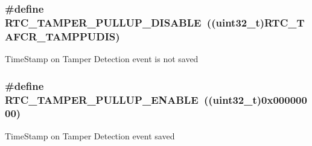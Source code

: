 \subsubsection[{\texorpdfstring{R\+T\+C\+\_\+\+T\+A\+M\+P\+E\+R\+\_\+\+P\+U\+L\+L\+U\+P\+\_\+\+D\+I\+S\+A\+B\+LE}{RTC_TAMPER_PULLUP_DISABLE}}]{\setlength{\rightskip}{0pt plus 5cm}\#define R\+T\+C\+\_\+\+T\+A\+M\+P\+E\+R\+\_\+\+P\+U\+L\+L\+U\+P\+\_\+\+D\+I\+S\+A\+B\+LE~((uint32\+\_\+t)R\+T\+C\+\_\+\+T\+A\+F\+C\+R\+\_\+\+T\+A\+M\+P\+P\+U\+D\+IS)}\hypertarget{group___r_t_c_ex___tamper___pull___u_p___definitions_ga60baa301b46be499bc7f827664df0300}{}\label{group___r_t_c_ex___tamper___pull___u_p___definitions_ga60baa301b46be499bc7f827664df0300}
Time\+Stamp on Tamper Detection event is not saved 
\subsubsection[{\texorpdfstring{R\+T\+C\+\_\+\+T\+A\+M\+P\+E\+R\+\_\+\+P\+U\+L\+L\+U\+P\+\_\+\+E\+N\+A\+B\+LE}{RTC_TAMPER_PULLUP_ENABLE}}]{\setlength{\rightskip}{0pt plus 5cm}\#define R\+T\+C\+\_\+\+T\+A\+M\+P\+E\+R\+\_\+\+P\+U\+L\+L\+U\+P\+\_\+\+E\+N\+A\+B\+LE~((uint32\+\_\+t)0x00000000)}\hypertarget{group___r_t_c_ex___tamper___pull___u_p___definitions_gacf26dd43efe81fa45121580187705369}{}\label{group___r_t_c_ex___tamper___pull___u_p___definitions_gacf26dd43efe81fa45121580187705369}
Time\+Stamp on Tamper Detection event saved 